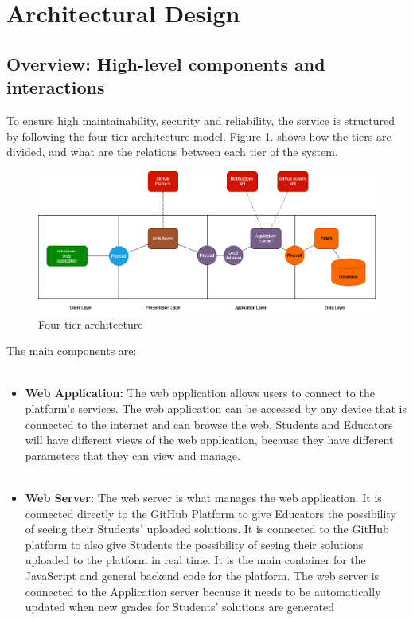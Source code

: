 \documentclass{article}
\begin{document}
{\section{Architectural Design}
\subsection{Overview: High-level components and interactions}
To ensure high maintainability, security and reliability, the service is structured by following the four-tier architecture model.
Figure 1. shows how the tiers are divided, and what are the relations between each tier of the system.
\begin{figure}[H]
    \centering
    \includegraphics[scale=0.35]{images/FourTierApplication.png}
    \caption{Four-tier architecture}
    \label{fig:Figure 1}
\end{figure}
\noindent
The main components are: \\ \\
\begin{itemize}
\item \textbf{Web Application:} The web application allows users to connect to the platform's services. The web application can be accessed by any device
that is connected to the internet and can browse the web. Students and Educators will have different views of the web application, because they have
different parameters that they can view and manage. \\ \\
\item \textbf{Web Server:} The web server is what manages the web application. It is connected directly to the GitHub Platform to give Educators the possibility
of seeing their Students' uploaded solutions. It is connected to the GitHub platform to also give Students the possibility of seeing their
solutions uploaded to the platform in real time. It is the main container for the JavaScript and general backend code for the platform.
The web server is connected to the Application server because it needs to be automatically updated when new grades for Students' solutions are generated

\end{itemize}}
\end{document}
